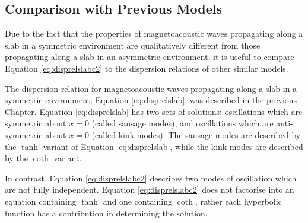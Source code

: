 \subsection{Comparison with Previous Models}
\label{subsec:comparison}

Due to the fact that the properties of magnetoacoustic waves propagating along a slab in a symmetric environment are qualitatively different from those propagating along a slab in an asymmetric environment, it is useful to compare Equation \eqref{eq:disprelslabc2} to the dispersion relations of other similar models.

The dispersion relation for magnetoacoustic waves propagating along a slab in a symmetric environment, Equation \eqref{eq:disprelslab}, was described in the previous Chapter.
Equation \eqref{eq:disprelslab} has two sets of solutions: oscillations which are symmetric about $x=0$ (called sausage modes), and oscillations which are anti-symmetric about $x=0$ (called kink modes).
The sausage modes are described by the $\tanh$ variant of Equation \eqref{eq:disprelslab}, while the kink modes are described by the $\coth$ variant.

In contrast, Equation \eqref{eq:disprelslabc2} describes two modes of oscillation which are not fully independent.
Equation \eqref{eq:disprelslabc2} does not factorise into an equation containing $\tanh$ and one containing $\coth$, rather each hyperbolic function has a contribution in determining the solution.

